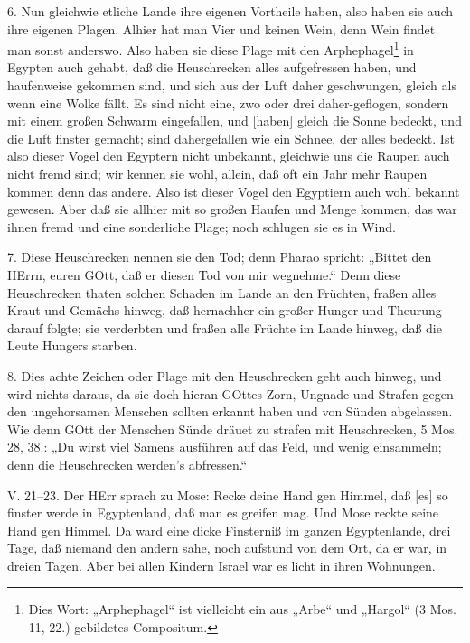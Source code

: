 6. Nun gleichwie etliche Lande ihre eigenen Vortheile haben, also haben sie auch ihre eigenen Plagen. Alhier hat man Vier und keinen Wein, denn Wein findet man sonst anderswo. Also haben sie diese Plage mit den Arphephagel\footnote{Dies Wort: „Arphephagel“ ist vielleicht ein aus „Arbe“ und „Hargol“ (3 Mos. 11, 22.) gebildetes Compositum.} in Egypten auch gehabt, daß die Heuschrecken alles aufgefressen haben, und haufenweise gekommen sind, und sich aus der Luft daher geschwungen, gleich als wenn eine Wolke fällt. Es sind nicht eine, zwo oder drei daher-geflogen, sondern mit einem großen Schwarm eingefallen, und [haben] gleich die Sonne bedeckt, und die Luft finster gemacht; sind dahergefallen wie ein Schnee, der alles bedeckt. Ist also dieser Vogel den Egyptern nicht unbekannt, gleichwie uns die Raupen auch nicht fremd sind;
wir kennen sie wohl, allein, daß oft ein Jahr mehr Raupen kommen denn das andere. Also ist dieser Vogel den Egyptiern auch wohl bekannt gewesen. Aber daß sie allhier mit so großen Haufen und Menge kommen, das war ihnen fremd und eine sonderliche Plage; noch schlugen sie es in Wind.

7. Diese Heuschrecken nennen sie den Tod; denn Pharao spricht: „Bittet den HErrn, euren GOtt, daß er diesen Tod von mir wegnehme.“ Denn diese Heuschrecken thaten solchen Schaden im Lande an den Früchten, fraßen alles Kraut und Gemächs hinweg, daß hernachher ein großer Hunger und Theurung darauf folgte; sie verderbten und fraßen alle Früchte im Lande hinweg, daß die Leute Hungers starben.

8. Dies achte Zeichen oder Plage mit den Heuschrecken geht auch hinweg, und wird nichts daraus, da sie doch hieran GOttes Zorn, Ungnade und Strafen gegen den ungehorsamen Menschen sollten erkannt haben und von Sünden abgelassen. Wie denn GOtt der Menschen Sünde dräuet zu strafen mit Heuschrecken, 5 Mos. 28, 38.: „Du wirst viel Samens ausführen auf das Feld, und wenig einsammeln; denn die Heuschrecken werden’s abfressen.“

\begin{schriftzitat}
V. 21–23. Der HErr sprach zu Mose: Recke deine Hand gen Himmel, daß [es] so finster werde in Egyptenland, daß man es greifen mag. Und Mose reckte seine Hand gen Himmel. Da ward eine dicke Finsterniß im ganzen Egyptenlande, drei Tage, daß niemand den andern sahe, noch aufstund von dem Ort, da er war, in dreien Tagen. Aber bei allen Kindern Israel war es licht in ihren Wohnungen.
\end{schriftzitat}

